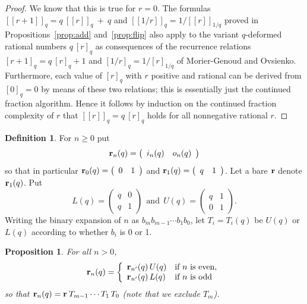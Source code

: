 \documentclass[12pt]{article}
\theoremstyle{plain}
\newtheorem{proposition}[theorem]{Proposition}
\theoremstyle{definition}
\newtheorem{definition}[theorem]{Definition}
\theoremstyle{remark}
\newcommand{\llb}{[\![}
\newcommand{\rrb}{]\!]}
\begin{document}
\begin{proof}
We know that this is true for $r=0$.
The formulas $\llb r+1 \rrb_q = q \: \llb r \rrb_q \: + \: q$
and $\llb 1/r \rrb_q = 1 / \llb r \rrb_{1/q}$ 
proved in Propositions~\ref{prop:add} and~\ref{prop:flip}
also apply to the variant $q$-deformed rational numbers $q \: [r]_q$
as consequences of the recurrence relations
$[r+1]_q = q \: [r]_q + 1$ and $[1/r]_q = 1/[r]_{1/q}$
of Morier-Genoud and Ovsienko.
Furthermore, each value of $[r]_q$ with $r$ positive and rational
can be derived from $[0]_q = 0$ by means of these two relations;
this is essentially just the continued fraction algorithm. 
Hence it follows by induction on the continued fraction complexity of $r$
that $\llb r \rrb_q = q \: [r]_q$ holds for all nonnegative rational $r$.
\end{proof}

\begin{definition}
For $n \geq 0$ put 
$${\bf r}_n (q) = 
\left( \begin{array}{cc} i_n (q) & o_n (q) \end{array} \right)$$
so that in particular
${\bf r}_0 (q) = \left( \begin{array}{cc} 0 & 1 \end{array} \right)$
and
${\bf r}_1 (q) = \left( \begin{array}{cc} q & 1 \end{array} \right)$.
Let a bare ${\bf r}$ denote ${\bf r}_1 (q)$.
Put $$L(q) = \left( \begin{array}{cc} q & 0 \\ q & 1 \end{array} \right)
\ \ \text{and}
\ \ U(q) = \left( \begin{array}{cc} q & 1 \\ 0 & 1 \end{array} \right).$$
Writing the binary expansion of $n$ as $b_m b_{m-1} \cdots b_1 b_0$,
let $T_i=T_i(q)$ be $U(q)$ or $L(q)$ according to whether $b_i$ is 0 or 1.
\end{definition}

\begin{proposition}
For all $n>0$,
$${\bf r}_n (q)= 
\left\{ \begin{array}{ll}
{\bf r}_{n'} (q) \, U(q) & \mbox{if $n$ is even,} \\
{\bf r}_{n'} (q) \, L(q) & \mbox{if $n$ is odd}
\end{array} \right.$$
so that 
${\bf r}_n (q) = {\bf r} \: T_{m-1} \cdots T_1 \, T_0$
(note that we exclude $T_m$).
\end{proposition}
\end{document}
